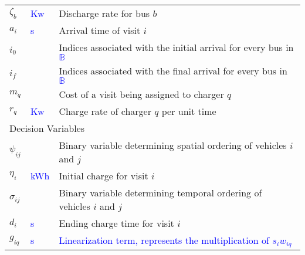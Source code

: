 \documentclass[utf8]{FrontiersinHarvard}
\begin{document}
\begin{table}[!htpb]
\begin{tabularx}{\textwidth}{l l l}
    $\zeta_b$                    & \textcolor{blue}{Kw}    & Discharge rate for bus $b$                                                                                        \\
    $a_i$                    & \textcolor{blue}{s}     & Arrival time of visit $i$                                                                                         \\
    $i_0$                    &                         & Indices associated with the initial arrival
    for every bus in \textcolor{blue}{$\mathbb{B}$}                                                                                                                        \\
    $i_f$                    &                         & Indices associated with the final arrival for every bus in \textcolor{blue}{$\mathbb{B}$}                         \\
    $m_q$                    &                         & Cost of a visit being assigned to charger $q$                                                                     \\
    $r_q$                    & \textcolor{blue}{Kw}    & Charge rate of charger $q$ per unit time                                                                          \\
    \hline \multicolumn{3}{l}{Decision Variables}                                                                                                                          \\
    \hline $\psi_{ij}$          &                         & Binary variable determining spatial ordering of vehicles $i$ and $j$                                              \\
    $\eta_i$                    & \textcolor{blue}{kWh}   & Initial charge for visit $i$                                                                                      \\
    $\sigma_{ij}$                 &                         & Binary variable determining temporal ordering of vehicles $i$ and $j$                                             \\
    $d_i$                    & \textcolor{blue}{s}     & Ending charge time for visit $i$                                                                                  \\
    $g_{iq}$                 & \textcolor{blue}{s}     & \textcolor{blue}{Linearization term, represents the multiplication of $s_i w_{iq}$}                               \\

\end{tabularx}
\end{table}
\end{document}
